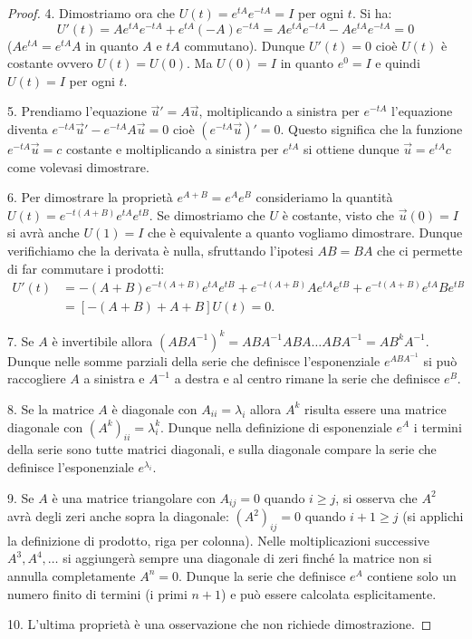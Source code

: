 \begin{theorem}
\begin{proof}
4. Dimostriamo ora che $U(t) = e^{tA}e^{-tA}=I$ per ogni $t$. Si ha:
\[
 U'(t) = A e^{tA}e^{-tA} + e^{tA}(-A)e^{-tA}
       = A e^{tA}e^{-tA} - A e^{tA}e^{-tA} = 0
\]
($Ae^{tA} = e^{tA}A$ in quanto $A$ e $tA$ commutano).
Dunque $U'(t)=0$ cioè $U(t)$ è costante ovvero $U(t)=U(0)$. Ma $U(0)=I$
in quanto $e^0=I$ e quindi $U(t)=I$ per ogni $t$.

5. Prendiamo l'equazione $\vec u' = A\vec u$, moltiplicando a sinistra per
$e^{-tA}$ l'equazione diventa
$e^{-tA} \vec u' - e^{-tA} A \vec u=0$ cioè $(e^{-tA} \vec u)' = 0$. Questo significa
che la funzione $e^{-tA}\vec u = c$ costante e moltiplicando a sinistra per
$e^{tA}$ si ottiene dunque $\vec u = e^{tA}c$ come volevasi dimostrare.

6. Per dimostrare la proprietà $e^{A+B}=e^A e^B$ consideriamo la quantità
$U(t) = e^{-t(A+B)} e^{tA} e^{tB}$. Se dimostriamo che $U$ è costante,
visto che $\vec u(0)=I$ si avrà anche $U(1)=I$ che è equivalente a quanto
vogliamo dimostrare. Dunque verifichiamo che la derivata è nulla,
sfruttando l'ipotesi $AB=BA$ che ci permette di far commutare i prodotti:
\begin{align*}
U'(t) & = -(A+B)e^{-t(A+B)} e^{tA} e^{tB} + e^{-t(A+B)}Ae^{tA}e^{tB} +
e^{-t(A+B)}e^{tA} B e^{tB} \\
& = [-(A+B) + A + B] U(t) = 0.
\end{align*}

7. Se $A$ è invertibile allora $(ABA^{-1})^k = ABA^{-1}ABA\dots ABA^{-1}
= AB^k A^{-1}$. Dunque nelle somme parziali della serie che definisce l'esponenziale
$e^{ABA^{-1}}$ si può raccogliere $A$ a sinistra e $A^{-1}$ a destra e
al centro rimane la serie che definisce $e^B$.

8. Se la matrice $A$ è diagonale con $A_{ii}=\lambda_i$ allora $A^k$
risulta essere una matrice diagonale con $(A^k)_{ii} =
\lambda_i^k$. Dunque nella definizione di esponenziale $e^A$ i termini
della serie sono tutte matrici diagonali, e sulla diagonale compare la
serie che definisce l'esponenziale $e^{\lambda_i}$.

9. Se $A$ è una matrice triangolare con $A_{ij}=0$ quando $i\ge j$, si
osserva che $A^2$ avrà degli zeri anche sopra la diagonale:
$(A^2)_{ij}=0$ quando $i+1\ge j$ (si applichi la definizione di
prodotto, riga per colonna). Nelle moltiplicazioni successive $A^3,
A^4,\dots$ si aggiungerà sempre una diagonale di zeri finché la matrice non
si annulla completamente $A^n=0$. Dunque la serie che definisce $e^A$
contiene solo un numero finito di termini (i primi $n+1$) e può essere
calcolata esplicitamente.

10. L'ultima proprietà è una osservazione che non richiede dimostrazione.
\end{proof}
\end{theorem}
